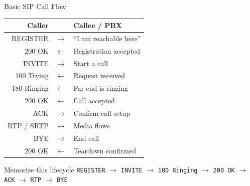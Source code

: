 \documentclass[aspectratio=169]{beamer}
\begin{document}
\begin{frame}{Basic SIP Call Flow}
  \begin{center}
  \small
  \begin{tabular}{rcl}
    Caller & & Callee / PBX \\
    \hline
    REGISTER & $\rightarrow$ & ``I am reachable here'' \\
    200 OK & $\leftarrow$ & Registration accepted \\
    INVITE & $\rightarrow$ & Start a call \\
    100 Trying & $\leftarrow$ & Request received \\
    180 Ringing & $\leftarrow$ & Far end is ringing \\
    200 OK & $\leftarrow$ & Call accepted \\
    ACK & $\rightarrow$ & Confirm call setup \\
    RTP / SRTP & $\leftrightarrow$ & Media flows \\
    BYE & $\rightarrow$ & End call \\
    200 OK & $\leftarrow$ & Teardown confirmed \\
  \end{tabular}
  \end{center}

  \vspace{0.35cm}
  \begin{alertblock}{Memorize this lifecycle}
    \texttt{REGISTER} $\rightarrow$ \texttt{INVITE} $\rightarrow$ \texttt{180 Ringing} $\rightarrow$ \texttt{200 OK} $\rightarrow$ \texttt{ACK} $\rightarrow$ \texttt{RTP} $\rightarrow$ \texttt{BYE}
  \end{alertblock}
\end{frame}
\end{document}
